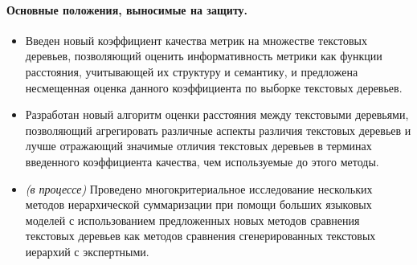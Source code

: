 \documentclass[12pt]{article}
\begin{document}
\paragraph{Основные положения, выносимые на защиту.}
\begin{itemize}
    \item Введен новый коэффициент качества метрик на множестве текстовых деревьев, позволяющий оценить информативность метрики как функции расстояния, учитывающей их структуру и семантику, и предложена несмещенная оценка данного коэффициента по выборке текстовых деревьев.
    \item Разработан новый алгоритм оценки расстояния между текстовыми деревьями, позволяющий агрегировать различные аспекты различия текстовых деревьев и лучше отражающий значимые отличия текстовых деревьев в терминах введенного коэффициента качества, чем используемые до этого методы.
    \item \textit{(в процессе)} Проведено многокритериальное исследование нескольких методов иерархической суммаризации при помощи больших языковых моделей с использованием предложенных новых методов сравнения текстовых деревьев как методов сравнения сгенерированных текстовых иерархий с экспертными.
\end{itemize}

\newpage
{}


\end{document}
